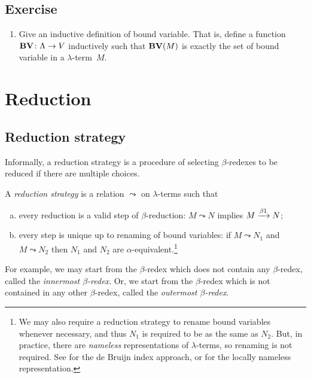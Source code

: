 \subsection*{Exercise}
\begin{enumerate}
  \item Give an inductive definition of bound variable. That is, define a
    function $\mathbf{BV}\colon \Lambda \to V$ inductively
    such that $\mathbf{BV}(M)$ is exactly the set of bound variable in a
    $\lambda$-term~$M$.
\end{enumerate}

\section{Reduction}
\subsection{Reduction strategy}
Informally, a reduction strategy is a procedure of selecting $\beta$-redexes
to be reduced if there are multiple choices. 
\begin{definition}
  A \emph{reduction strategy} is a relation $\leadsto$ on $\lambda$-terms
  such that
  \begin{enumerate}[(a)]
    \item every reduction is a valid step of $\beta$-reduction:
      $M \leadsto N$ implies $M \xrightarrow{\beta1} N$;
    \item every step is unique up to renaming of bound variables:
      if $M \leadsto N_1$ and $M \leadsto N_2$ then $N_1$ and $N_2$ are
      $\alpha$-equivalent.\footnote{%
        We may also require a reduction strategy 
        to rename bound variables whenever necessary, and thus  
        $N_1$ is required to be as the same as $N_2$. But, in practice,
        there are \emph{nameless} representations of $\lambda$-terms, so renaming
        is not required. See \cite[Appendix C]{Barendregt1984a} for the de Bruijn
        index approach, or \cite{Chargueraud2012} for the locally nameless
        representation.}
  \end{enumerate}
\end{definition}
For example, we may start from the $\beta$-redex which does not contain
any $\beta$-redex, called the \emph{innermost $\beta$-redex}. Or, we start from
the $\beta$-redex which is not contained in any other $\beta$-redex, called the
\emph{outermost $\beta$-redex}. 
